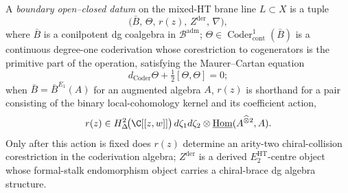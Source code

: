 \begin{defn}\label{defn:hol-bd-datum-HT}
A \emph{boundary open--closed datum} on the mixed-HT brane line
\(L\subset X\) is a tuple
\[
  \bigl(\bar B,\,\Theta,\,r(z),\,Z^{\mathrm{der}},\,\nabla\bigr),
\]
where \(\bar B\) is a conilpotent dg coalgebra in
\(\mathcal B^{\mathrm{adm}}\); \(\Theta\in
\operatorname{Coder}^1_{\mathrm{cont}}(\bar B)\) is a continuous
degree-one coderivation whose corestriction to cogenerators is the
primitive part of the operation, satisfying the Maurer--Cartan equation
\[
  d_{\operatorname{Coder}}\Theta+\tfrac12[\Theta,\Theta]=0;
\]
when \(\bar B=\bar B^{E_1}(A)\) for an augmented algebra \(A\), \(r(z)\)
is shorthand for a pair consisting of the binary local-cohomology kernel
and its coefficient action,
\[
  r(z)\in
  H^2_{\Delta}\!\bigl(\C[[z,w]]\bigr)\,d\zeta_1d\zeta_2\otimes
  \underline{\mathrm{Hom}}(A^{\widehat\otimes2},A).
\]
Only after this action is fixed does \(r(z)\) determine an arity-two
chiral-collision corestriction in the coderivation algebra;
\(Z^{\mathrm{der}}\) is a derived \(E_2^{\mathrm{HT}}\)-centre object
whose formal-stalk endomorphism object carries a chiral-brace dg
algebra structure.


\end{defn}
